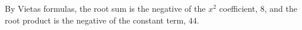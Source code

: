 By Vieta\textquotesingle s formulas, the root sum is the negative of the $x^2$ coefficient, $\boxed8$, and the root product is the negative of the constant term, $\boxed{44}$.
